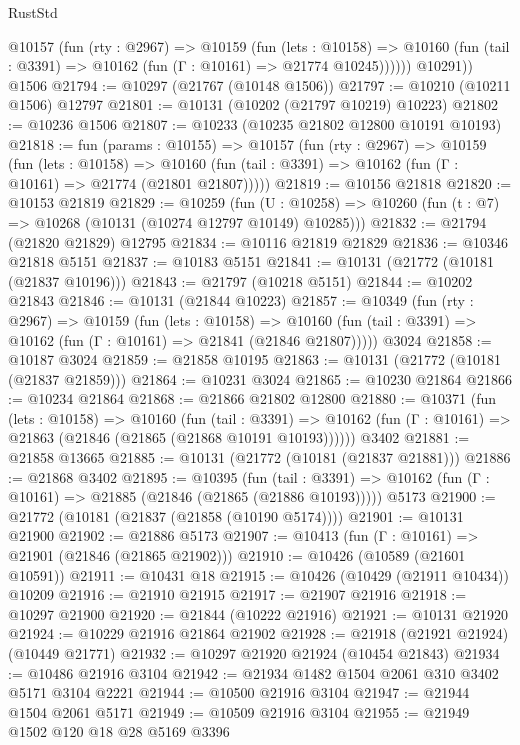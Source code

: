 \begin{lexlean}{RustStd}
\begin{coremodule}
          @10157
            (fun (rty : @2967) =>
            @10159
              (fun (lets : @10158) =>
              @10160 (fun (tail : @3391) => @10162 (fun (Γ : @10161) => @21774 @10245))))))
        @10291))
    @1506
@21794 := @10297 (@21767 (@10148 @1506))
@21797 := @10210 (@10211 @1506) @12797
@21801 := @10131 (@10202 (@21797 @10219) @10223)
@21802 := @10236 @1506
@21807 := @10233 (@10235 @21802 @12800 @10191 @10193)
@21818 := fun (params : @10155) =>
  @10157
    (fun (rty : @2967) =>
    @10159
      (fun (lets : @10158) =>
      @10160 (fun (tail : @3391) => @10162 (fun (Γ : @10161) => @21774 (@21801 @21807)))))
@21819 := @10156 @21818
@21820 := @10153 @21819
@21829 := @10259
    (fun (U : @10258) => @10260 (fun (t : @7) => @10268 (@10131 (@10274 @12797 @10149) @10285)))
@21832 := @21794 (@21820 @21829) @12795
@21834 := @10116 @21819 @21829
@21836 := @10346 @21818 @5151
@21837 := @10183 @5151
@21841 := @10131 (@21772 (@10181 (@21837 @10196)))
@21843 := @21797 (@10218 @5151)
@21844 := @10202 @21843
@21846 := @10131 (@21844 @10223)
@21857 := @10349
    (fun (rty : @2967) =>
    @10159
      (fun (lets : @10158) =>
      @10160 (fun (tail : @3391) => @10162 (fun (Γ : @10161) => @21841 (@21846 @21807)))))
    @3024
@21858 := @10187 @3024
@21859 := @21858 @10195
@21863 := @10131 (@21772 (@10181 (@21837 @21859)))
@21864 := @10231 @3024
@21865 := @10230 @21864
@21866 := @10234 @21864
@21868 := @21866 @21802 @12800
@21880 := @10371
    (fun (lets : @10158) =>
    @10160
      (fun (tail : @3391) =>
      @10162 (fun (Γ : @10161) => @21863 (@21846 (@21865 (@21868 @10191 @10193))))))
    @3402
@21881 := @21858 @13665
@21885 := @10131 (@21772 (@10181 (@21837 @21881)))
@21886 := @21868 @3402
@21895 := @10395
    (fun (tail : @3391) => @10162 (fun (Γ : @10161) => @21885 (@21846 (@21865 (@21886 @10193)))))
    @5173
@21900 := @21772 (@10181 (@21837 (@21858 (@10190 @5174))))
@21901 := @10131 @21900
@21902 := @21886 @5173
@21907 := @10413 (fun (Γ : @10161) => @21901 (@21846 (@21865 @21902)))
@21910 := @10426 (@10589 (@21601 @10591))
@21911 := @10431 @18
@21915 := @10426 (@10429 (@21911 @10434)) @10209
@21916 := @21910 @21915
@21917 := @21907 @21916
@21918 := @10297 @21900
@21920 := @21844 (@10222 @21916)
@21921 := @10131 @21920
@21924 := @10229 @21916 @21864 @21902
@21928 := @21918 (@21921 @21924) (@10449 @21771)
@21932 := @10297 @21920 @21924 (@10454 @21843)
@21934 := @10486 @21916 @3104
@21942 := @21934 @1482 @1504 @2061 @310 @3402 @5171 @3104 @2221
@21944 := @10500 @21916 @3104
@21947 := @21944 @1504 @2061 @5171
@21949 := @10509 @21916 @3104
@21955 := @21949 @1502 @120 @18 @28 @5169 @3396

\end{coremodule}
\end{lexlean}

